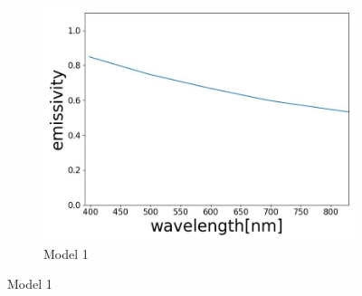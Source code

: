 \begin{figure}[htbp]
\begin{subfigure}{0.3\linewidth}
      \includegraphics[width=\linewidth]{figures/emissivity_21.jpg}
      \caption{Model 1}
      \label{fig: emi_21}
    \end{subfigure}
    
    \medskip
    

\end{figure}
